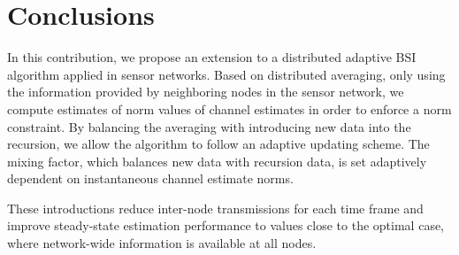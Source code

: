 \documentclass{article}
\begin{document}
\section[]{Conclusions}
\label{sec:conclusions}
In this contribution, we propose an extension to a distributed adaptive BSI algorithm applied in sensor networks.
Based on distributed averaging, only using the information provided by neighboring nodes in the sensor network, we compute estimates of norm values of channel estimates in order to enforce a norm constraint.
By balancing the averaging with introducing new data into the recursion, we allow the algorithm to follow an adaptive updating scheme.
The mixing factor, which balances new data with recursion data, is set adaptively dependent on instantaneous channel estimate norms.

These introductions reduce inter-node transmissions for each time frame and improve steady-state estimation performance to values close to the optimal case, where network-wide information is available at all nodes.



\vfill\pagebreak



\end{document}
